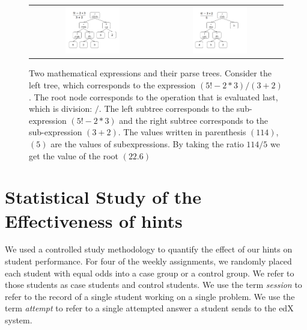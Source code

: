 \documentclass{llncs2e/llncs}
\begin{document}
\begin{figure}
  \centering
   \begin{tabular}{c c}
		\includegraphics[width=0.45\textwidth]{image/ParseTrees1.png} &
		\includegraphics[width=0.45\textwidth]{image/ParseTrees2.png}
	\end{tabular}
   \caption{Two mathematical expressions and their parse trees. Consider the left tree, which corresponds to the expression $(5!-2*3)/(3+2)$. The root node corresponds to the operation that is evaluated last, which is division: $/$. The left subtree corresponds to the sub-expression $(5!-2*3)$ and the right subtree corresponds to the sub-expression $(3+2)$. The values written in parenthesis $(114)$,$(5)$ are the values of subexpressions. By taking the ratio $114/5$ we get the value of the root $(22.6)$}
   \label{fig:parse_tree}
\end{figure}

\section{Statistical Study of the Effectiveness of hints}

We used a controlled study methodology to quantify the effect of our hints on student performance. For four of the weekly assignments, we randomly placed each student with equal odds into a case group or a control group. We refer to those students as case students and control students.  We use the term {\em session} to refer to the record of a single student working on a single problem. We use the term {\em attempt} to refer to a single attempted answer a student sends to the edX system.
\end{document}
